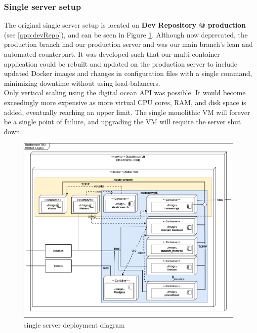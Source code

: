 \subsubsection{Single server setup}
\label{subsubsec:scalingProd}
The original single server setup is located on \textbf{Dev Repository @ production} (see \ref{app:devRepo}), and can be seen in Figure \ref{fig:legacyDeploy}.
Although now deprecated, the production branch had our production server and was our main branch's lean and automated counterpart. It was developed such that our multi-container application could be rebuilt and updated on the production server to include updated Docker images and changes in configuration files with a single command, minimizing downtime without using load-balancers.\\
Only vertical scaling using the digital ocean API was possible. It would become exceedingly more expensive as more virtual CPU cores, RAM, and disk space is added, eventually reaching an upper limit. The single monolithic VM will forever be a single point of failure, and upgrading the VM will require the server shut down.
\begin {figure}[H]
    \centering
    \includegraphics[scale=0.47]{images/deployment_diagrams/DevopsDiagrams-Legacy deploy mini.drawio.png}
    \caption{\mini single server deployment diagram}
    \label{fig:legacyDeploy}
\end{figure}

